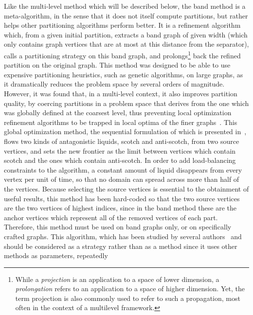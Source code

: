 \begin{itemize}
\iteme[{\bf Band}]
Like the multi-level method which will be described below, the band
method is a meta-algorithm, in the sense that it does not itself
compute partitions, but rather helps other partitioning algorithms
perform better. It is a refinement algorithm which, from a given
initial partition, extracts a band graph of given width (which only
contains graph vertices that are at most at this distance from the
separator), calls a partitioning strategy on this band graph, and
prolongs\footnote{While a \emph{projection} is an application to a
space of lower dimension, a \emph{prolongation} refers to an
application to a space of higher dimension. Yet, the term projection
is also commonly used to refer to such a propagation, most often in
the context of a multilevel framework.} back the refined partition
on the original graph. This method was designed to be able to use
expensive partitioning heuristics, such as genetic algorithms, on
large graphs, as it dramatically reduces the problem space by several
orders of magnitude. However, it was found that, in a multi-level
context, it also improves partition quality, by coercing partitions in
a problem space that derives from the one which was globally defined
at the coarsest level, thus preventing local optimization refinement
algorithms to be trapped in local optima of the finer
graphs~\cite{chpe06a}.
\iteme[{\bf Diffusion}]
This global optimization method, the sequential formulation of which
is presented in~\cite{pell07b}, flows two kinds of antagonistic
liquids, scotch and anti-scotch, from two source vertices, and sets
the new frontier as the limit between vertices which contain scotch
and the ones which contain anti-scotch. In order to add
load-balancing constraints to the algorithm, a constant amount of
liquid disappears from every vertex per unit of time, so that no
domain can spread across more than half of the vertices. Because
selecting the source vertices is essential to the obtainment of
useful results, this method has been hard-coded so that the two
source vertices are the two vertices of highest indices, since in the
band method these are the anchor vertices which represent all of the
removed vertices of each part. Therefore, this method must be used on
band graphs only, or on specifically crafted graphs.
\label{sec-algo-mle}
This algorithm, which has been studied by several
authors~\cite{basi94,hele93b,kaku95a} and should be considered as a strategy
rather than as a method since it uses other methods as parameters, repeatedly

\end{itemize}
